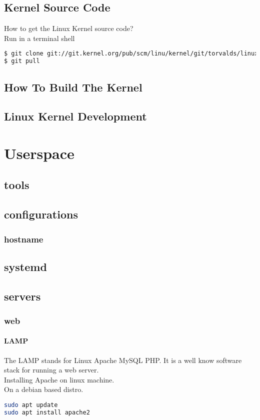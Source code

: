 \documentclass{book}
\begin{document}
\chapter{Kernel Source Code}

How to get the Linux Kernel source code?\\
Run in a terminal shell
\begin{lstlisting}[language=bash]
$ git clone git://git.kernel.org/pub/scm/linu/kernel/git/torvalds/linux.git
$ git pull 
\end{lstlisting}

\chapter{How To Build The Kernel}

\chapter{Linux Kernel Development}


\part{Userspace}

\chapter{tools}

\chapter{configurations}

\section{hostname}


\chapter{systemd}

\chapter{servers}

\section{web}
\subsection{LAMP}
The LAMP stands for Linux Apache MySQL PHP. It is a well know software stack for running a web server. \\
Installing Apache on linux machine.\\
On a debian based distro.
\begin{lstlisting}[language=bash]
sudo apt update
sudo apt install apache2
\end{lstlisting}
\end{document}
